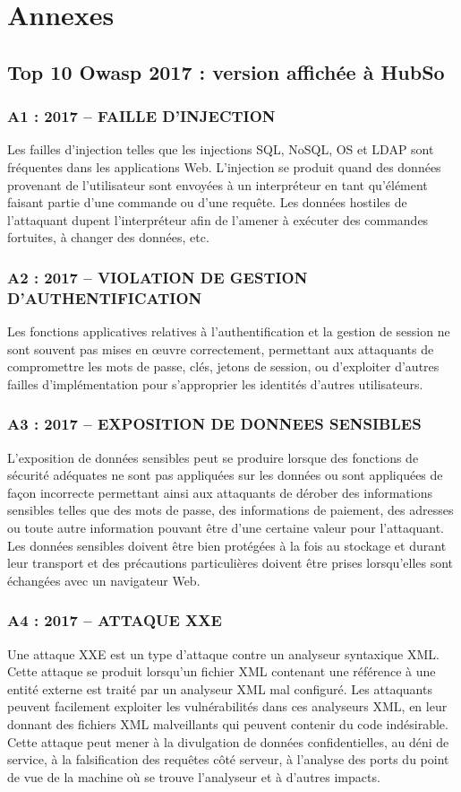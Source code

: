 \chapter*{Annexes}
\section{Top 10 Owasp 2017 : version affichée à HubSo}
\subsection{A1 : 2017 – FAILLE D’INJECTION}
Les failles d’injection telles que les injections SQL, NoSQL, OS et LDAP sont fréquentes dans les applications Web. L'injection se produit quand des données provenant de l'utilisateur sont envoyées à un interpréteur en tant qu'élément faisant partie d'une commande ou d'une requête. Les données hostiles de l'attaquant dupent l'interpréteur afin de l'amener à exécuter des commandes fortuites, à changer des données, etc.
\subsection{A2 : 2017 – VIOLATION DE GESTION D’AUTHENTIFICATION}
Les fonctions applicatives relatives à l'authentification et la gestion de session ne sont souvent pas mises en œuvre correctement, permettant aux attaquants de compromettre les mots de passe, clés, jetons de session, ou d'exploiter d'autres failles d'implémentation pour s'approprier les identités d'autres utilisateurs.
\subsection{A3 : 2017 – EXPOSITION DE DONNEES SENSIBLES}
L’exposition de données sensibles peut se produire lorsque des fonctions de sécurité adéquates ne sont pas appliquées sur les données ou sont appliquées de façon incorrecte permettant ainsi  aux attaquants de dérober des informations sensibles telles que des mots de passe, des informations de paiement, des adresses ou toute autre information pouvant être d’une certaine valeur pour l’attaquant. Les données sensibles doivent être bien protégées à la fois au stockage et durant leur transport et des précautions particulières doivent être prises lorsqu’elles sont échangées avec un navigateur Web.
\subsection{A4 : 2017 – ATTAQUE XXE}
Une attaque XXE est un type d’attaque contre un analyseur syntaxique XML. Cette attaque se produit lorsqu’un fichier XML contenant une référence à une entité externe est traité par un analyseur XML mal configuré. Les attaquants peuvent facilement exploiter les vulnérabilités dans ces analyseurs XML, en leur donnant des fichiers XML malveillants qui peuvent contenir du code indésirable. Cette attaque peut mener à la divulgation de données confidentielles, au déni de service, à la falsification des requêtes côté serveur, à l'analyse des ports du point de vue de la machine où se trouve l'analyseur et à d'autres impacts.
